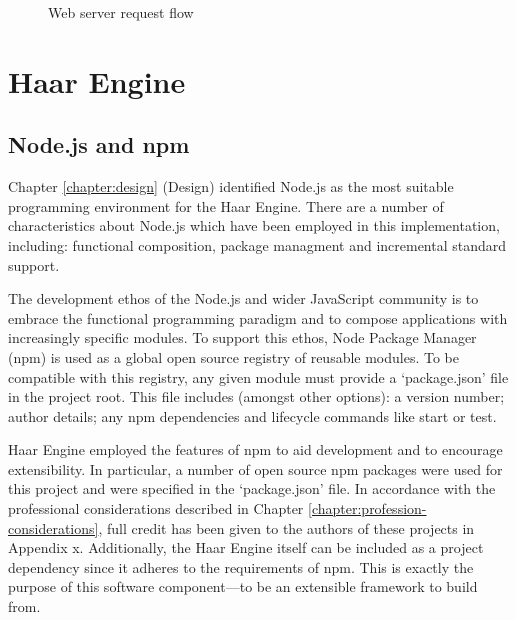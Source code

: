     \begin{figure}
      \centering
      \caption{Web server request flow}
      \label{figure:reverse-proxy}
    \end{figure}

  \section{Haar Engine}

    \subsection{Node.js and npm}
      Chapter \ref{chapter:design} (Design) identified Node.js as the most suitable programming environment for the Haar Engine. There are a number of characteristics  about Node.js which have been employed in this implementation, including: functional composition, package managment and incremental standard support.

      The development ethos of the Node.js and wider JavaScript community is to embrace the functional programming paradigm and to compose applications with increasingly specific modules. To support this ethos, Node Package Manager (npm) is used as a global open source registry of reusable modules. To be compatible with this registry, any given module must provide a `package.json' file in the project root. This file includes (amongst other options): a version number; author details; any npm dependencies and lifecycle commands like start or test.

      Haar Engine employed the features of npm to aid development and to encourage extensibility. In particular, a number of open source npm packages were used for this project and were specified in the `package.json' file. In accordance with the professional considerations described in Chapter \ref{chapter:profession-considerations}, full credit has been given to the authors of these projects in Appendix x. Additionally, the Haar Engine itself can be included as a project dependency since it adheres to the requirements of npm. This is exactly the purpose of this software component---to be an extensible framework to build from.

